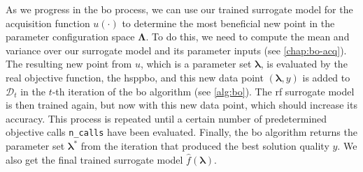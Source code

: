 As we progress in the \gls{bo} process, we can use our trained surrogate model for the acquisition function $u(\cdot)$ to determine the most beneficial new point in the parameter configuration space $\mathbf{\Lambda}$. To do this, we need to compute the mean and variance over our surrogate model and its parameter inputs (see \cref{chap:bo-acq}). The resulting new point from $u$, which is a parameter set $\mathbf{\lambda}$, is evaluated by the real objective function, the \gls{hsppbo}, and this new data point $(\mathbf{\lambda}, y)$ is added to $\mathcal{D}_t$ in the $t$-th iteration of the \gls{bo} algorithm (see \cref{alg:bo}). The \gls{rf} surrogate model is then trained again, but now with this new data point, which should increase its accuracy. This process is repeated until a certain number of predetermined objective calls \texttt{n\_calls} have been evaluated. Finally, the \gls{bo} algorithm returns the parameter set $\mathbf{\lambda}^*$ from the iteration that produced the best solution quality $y$. We also get the final trained surrogate model $\hat{f}(\mathbf{\lambda})$.